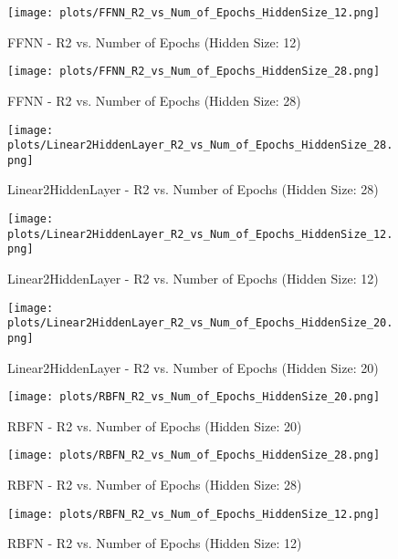 \begin{figure}[H]
    \centering
    \texttt{[image: plots/FFNN\_R2\_vs\_Num\_of\_Epochs\_HiddenSize\_12.png]}
    \caption{FFNN - R2 vs. Number of Epochs (Hidden Size: 12)}
\end{figure}

\begin{figure}[H]
    \centering
    \texttt{[image: plots/FFNN\_R2\_vs\_Num\_of\_Epochs\_HiddenSize\_28.png]}
    \caption{FFNN - R2 vs. Number of Epochs (Hidden Size: 28)}
\end{figure}

\begin{figure}[H]
    \centering
    \texttt{[image: plots/Linear2HiddenLayer\_R2\_vs\_Num\_of\_Epochs\_HiddenSize\_28.png]}
    \caption{Linear2HiddenLayer - R2 vs. Number of Epochs (Hidden Size: 28)}
\end{figure}

\begin{figure}[H]
    \centering
    \texttt{[image: plots/Linear2HiddenLayer\_R2\_vs\_Num\_of\_Epochs\_HiddenSize\_12.png]}
    \caption{Linear2HiddenLayer - R2 vs. Number of Epochs (Hidden Size: 12)}
\end{figure}

\begin{figure}[H]
    \centering
    \texttt{[image: plots/Linear2HiddenLayer\_R2\_vs\_Num\_of\_Epochs\_HiddenSize\_20.png]}
    \caption{Linear2HiddenLayer - R2 vs. Number of Epochs (Hidden Size: 20)}
\end{figure}

\begin{figure}[H]
    \centering
    \texttt{[image: plots/RBFN\_R2\_vs\_Num\_of\_Epochs\_HiddenSize\_20.png]}
    \caption{RBFN - R2 vs. Number of Epochs (Hidden Size: 20)}
\end{figure}

\begin{figure}[H]
    \centering
    \texttt{[image: plots/RBFN\_R2\_vs\_Num\_of\_Epochs\_HiddenSize\_28.png]}
    \caption{RBFN - R2 vs. Number of Epochs (Hidden Size: 28)}
\end{figure}

\begin{figure}[H]
    \centering
    \texttt{[image: plots/RBFN\_R2\_vs\_Num\_of\_Epochs\_HiddenSize\_12.png]}
    \caption{RBFN - R2 vs. Number of Epochs (Hidden Size: 12)}
\end{figure}

